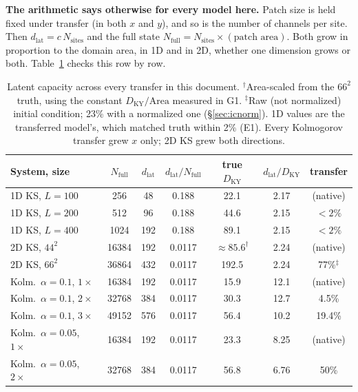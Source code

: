 \documentclass[11pt]{article}
\begin{document}
\textbf{The arithmetic says otherwise for every model here.} Patch size is
held fixed under transfer (in both $x$ and $y$), and so is the number of
channels per site. Then $d_{\mathrm{lat}} = c\,N_{\mathrm{sites}}$ and the
full state $N_{\mathrm{full}} = N_{\mathrm{sites}}\times(\text{patch
area})$. Both grow in proportion to the domain area, in 1D and in 2D,
whether one dimension grows or both. Table~\ref{tab:capacity} checks this
row by row.

\begin{table}[h]
\centering
\small
\begin{tabular}{lcccccc}
\toprule
System, size & $N_{\mathrm{full}}$ & $d_{\mathrm{lat}}$ &
$d_{\mathrm{lat}}/N_{\mathrm{full}}$ & true $D_{\mathrm{KY}}$ &
$d_{\mathrm{lat}}/D_{\mathrm{KY}}$ & transfer \\
\midrule
1D KS, $L{=}100$ & 256 & 48 & 0.188 & 22.1 & 2.17 & (native) \\
1D KS, $L{=}200$ & 512 & 96 & 0.188 & 44.6 & 2.15 & $<2\%$ \\
1D KS, $L{=}400$ & 1024 & 192 & 0.188 & 89.1 & 2.15 & $<2\%$ \\
\midrule
2D KS, $44^2$ & 16384 & 192 & 0.0117 & $\approx85.6^\dagger$ & 2.24 & (native) \\
2D KS, $66^2$ & 36864 & 432 & 0.0117 & 192.5 & 2.24 & 77\%$^\ddagger$ \\
\midrule
Kolm.\ $\alpha{=}0.1$, $1\times$ & 16384 & 192 & 0.0117 & 15.9 & 12.1 & (native) \\
Kolm.\ $\alpha{=}0.1$, $2\times$ & 32768 & 384 & 0.0117 & 30.3 & 12.7 & 4.5\% \\
Kolm.\ $\alpha{=}0.1$, $3\times$ & 49152 & 576 & 0.0117 & 56.4 & 10.2 & 19.4\% \\
Kolm.\ $\alpha{=}0.05$, $1\times$ & 16384 & 192 & 0.0117 & 23.3 & 8.25 & (native) \\
Kolm.\ $\alpha{=}0.05$, $2\times$ & 32768 & 384 & 0.0117 & 56.8 & 6.76 & 50\% \\
\bottomrule
\end{tabular}
\caption{Latent capacity across every transfer in this document.
$^\dagger$Area-scaled from the $66^2$ truth, using the constant
$D_{\mathrm{KY}}/\mathrm{Area}$ measured in G1. $^\ddagger$Raw (not normalized)
initial condition; 23\% with a normalized one (\S\ref{sec:icnorm}). 1D values are the
transferred model's, which matched truth within 2\% (E1). Every
Kolmogorov transfer grew $x$ only; 2D KS grew both directions.}
\label{tab:capacity}
\end{table}
\end{document}
